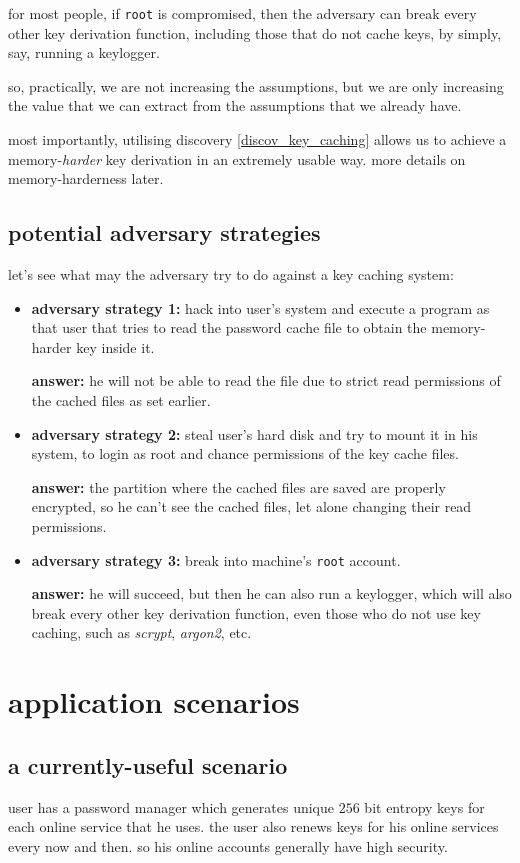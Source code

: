 \documentclass[twocolumn]{article}
\begin{document}
for most people, if \texttt{root} is compromised, then the adversary
can break every other key derivation function, including those that do
not cache keys, by simply, say, running a keylogger.

so, practically, we are not increasing the assumptions, but we are only
increasing the value that we can extract from the assumptions that we
already have.

most importantly, utilising discovery \ref{discov_key_caching} allows us to
achieve a memory-\emph{harder} key derivation in an extremely  usable way.
more details on memory-harderness later.

\subsection{potential adversary strategies}
let's see what may the adversary try to do against a key caching system:
\begin{itemize}
    \item \textbf{adversary strategy 1:} hack into user's system and execute a
    program as that user that tries to read the password cache file to
    obtain the memory-harder key inside it.

    \textbf{answer:} he will not be able to read the file due to strict
    read permissions of the cached files as set earlier.

    \item \textbf{adversary strategy 2:} steal user's hard disk and try to
    mount it in his system, to login as root and chance permissions of the
    key cache files.

    \textbf{answer:} the partition where the cached files are saved are
    properly encrypted, so he can't see the cached files, let alone
    changing their read permissions.

    \item \textbf{adversary strategy 3:} break into machine's \texttt{root}
    account.

    \textbf{answer:} he will succeed, but then he can also run a keylogger,
    which will also break every other key derivation function, even those
    who do not use key caching, such as \emph{scrypt}, \emph{argon2}, etc.
\end{itemize}

\section{application scenarios}
\subsection{a currently-useful scenario}
user has a password manager which generates unique $256$ bit entropy keys for
each online service that he uses.  the user also renews keys for his online
services every now and then.   so his online accounts generally have high
security.  
\end{document}
